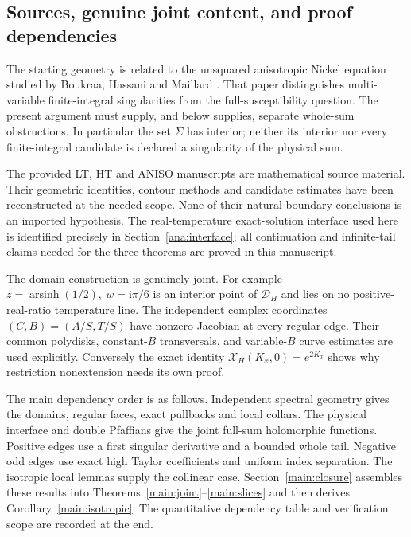 \documentclass[11pt]{article}
\numberwithin{equation}{section}
\theoremstyle{definition}
\newcommand{\ii}{\mathrm i}
\renewcommand{\DH}{\mathcal D_H}
\newcommand{\XH}{\mathcal X_H}
\begin{document}
\subsection{Sources, genuine joint content, and proof dependencies}

The starting geometry is related to the unsquared anisotropic Nickel
equation studied by Boukraa, Hassani and Maillard
\cite[Section 6]{BHM}. That paper distinguishes multi-variable
finite-integral singularities from the full-susceptibility question.
The present argument must supply, and below supplies, separate
whole-sum obstructions. In particular the set \(\Sigma\) has
interior; neither its interior nor every finite-integral candidate is
declared a singularity of the physical sum.

The provided LT, HT and ANISO manuscripts \cite{LTsource,HTsource,ANISOsource}
are mathematical source material. Their geometric identities, contour
methods and candidate estimates have been reconstructed at the needed
scope. None of their natural-boundary conclusions is an imported
hypothesis. The real-temperature exact-solution interface used here is
identified precisely in Section~\ref{ana:interface}; all continuation
and infinite-tail claims needed for the three theorems are proved in
this manuscript.

The domain construction is genuinely joint. For example
\(z=\operatorname{arsinh}(1/2),\ w=\ii\pi/6\) is an interior point
of \(\DH\) and lies on no positive-real-ratio temperature line.
The independent complex coordinates \((C,B)=(A/S,T/S)\) have
nonzero Jacobian at every regular edge. Their common polydisks,
constant-\(B\) transversals, and variable-\(B\) curve estimates
are used explicitly. Conversely the exact identity
\(\XH(K_x,0)=e^{2K_x}\) shows why restriction nonextension needs
its own proof.

The main dependency order is as follows. Independent spectral geometry
gives the domains, regular faces, exact pullbacks and local collars.
The physical interface and double Pfaffians give the joint full-sum
holomorphic functions. Positive edges use a first singular derivative
and a bounded whole tail. Negative odd edges use exact high Taylor
coefficients and uniform index separation. The isotropic local lemmas
supply the collinear case. Section~\ref{main:closure} assembles these
results into Theorems~\ref{main:joint}--\ref{main:slices} and then
derives Corollary~\ref{main:isotropic}. The quantitative dependency
table and verification scope are recorded at the end.
\end{document}
